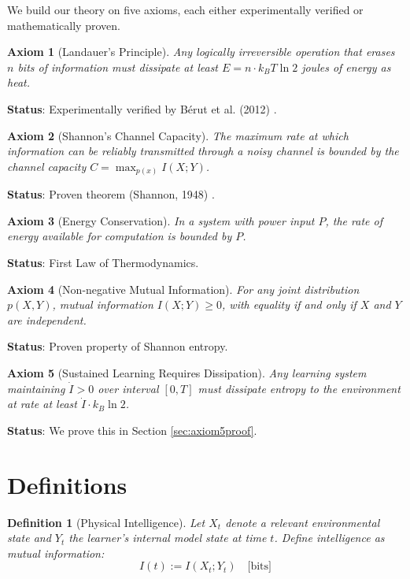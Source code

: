\documentclass{article}
\newtheorem{definition}[theorem]{Definition}
\newtheorem{axiom}{Axiom}
\begin{document}
We build our theory on five axioms, each either experimentally verified or mathematically proven.

\begin{axiom}[Landauer's Principle]
Any logically irreversible operation that erases $n$ bits of information must dissipate at least $E = n \cdot k_B T \ln 2$ joules of energy as heat.
\end{axiom}

\textbf{Status}: Experimentally verified by Bérut et al. (2012) \cite{berut2012}.

\begin{axiom}[Shannon's Channel Capacity]
The maximum rate at which information can be reliably transmitted through a noisy channel is bounded by the channel capacity $C = \max_{p(x)} I(X;Y)$.
\end{axiom}

\textbf{Status}: Proven theorem (Shannon, 1948) \cite{shannon1948}.

\begin{axiom}[Energy Conservation]
In a system with power input $P$, the rate of energy available for computation is bounded by $P$.
\end{axiom}

\textbf{Status}: First Law of Thermodynamics.

\begin{axiom}[Non-negative Mutual Information]
For any joint distribution $p(X,Y)$, mutual information $I(X;Y) \geq 0$, with equality if and only if $X$ and $Y$ are independent.
\end{axiom}

\textbf{Status}: Proven property of Shannon entropy.

\begin{axiom}[Sustained Learning Requires Dissipation]
Any learning system maintaining $\dot{I} > 0$ over interval $[0, T]$ must dissipate entropy to the environment at rate at least $\dot{I} \cdot k_B \ln 2$.
\end{axiom}

\textbf{Status}: We prove this in Section \ref{sec:axiom5proof}.

\section{Definitions}

\begin{definition}[Physical Intelligence]
Let $X_t$ denote a relevant environmental state and $Y_t$ the learner's internal model state at time $t$. Define intelligence as mutual information:
\begin{equation}
I(t) := I(X_t; Y_t) \quad \text{[bits]}
\end{equation}
\end{definition}
\end{document}
